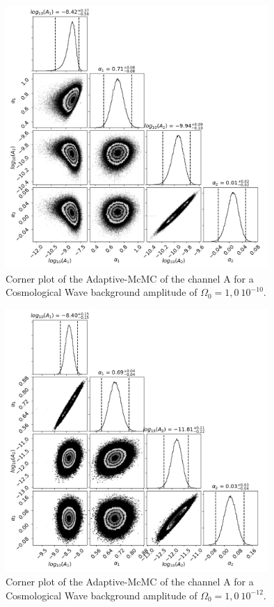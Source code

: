 \documentclass[a4paper,12pt]{article}
\begin{document}
\begin{figure}[H]
    \centering
    \includegraphics[height= 10cm]{1e-10/corners.png}
    \caption{Corner plot of the Adaptive-McMC of the channel A for a Cosmological Wave background amplitude of $\Omega_0 = 1,0 \ 10^{-10} $.  }
    \label{fig:corner10}
\end{figure}

\begin{figure}[H]
    \centering
    \includegraphics[height= 10cm]{corners.png}
    \caption{Corner plot of the Adaptive-McMC of the channel A for a Cosmological Wave background amplitude of $\Omega_0 = 1,0 \ 10^{-12} $. }
    \label{fig:corner12}
\end{figure}
\end{document}
